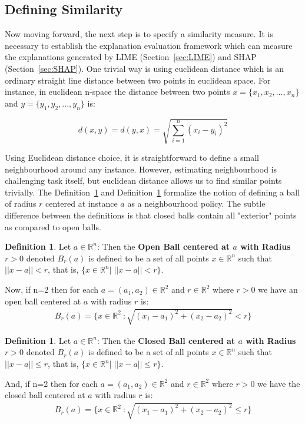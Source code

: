 \documentclass[english]{tktltiki2}
\theoremstyle{definition}
\newtheorem{definition}[thm]{Definition}
\theoremstyle{remark}
\begin{document}
\subsection{Defining Similarity}\label{sec:defining_similarity} %
Now moving forward, the next step is to specify a similarity measure. It is necessary to establish the explanation evaluation framework which can measure the explanations generated by LIME (Section~\ref{sec:LIME}) and SHAP (Section~\ref{sec:SHAP}). One trivial way is using euclidean distance which is an ordinary straight line distance between two points in euclidean space. For instance, in euclidean n-space the distance between two points $x = \{x_1, x_2, ..., x_n\}$ and $y = \{y_1, y_2, ..., y_n\}$ is:

\begin{equation}\label{eq:euclidean_distance}
d(x,y) = d(y,x) = \sqrt{\sum_{i=1}^{n}(x_i - y_i)^2}
\end{equation}

Using Euclidean distance choice, it is straightforward to define a small neighbourhood around any instance. However, estimating neighbourhood is challenging task itself, but euclidean distance allows us to find similar points trivially. The Definition~\ref{def:1} and Definition~\ref{def:2} formalize the notion of defining a ball of radius $r$ centered at instance $a$ as a neighbourhood policy. The subtle difference between the definitions is that closed balls contain all "exterior" points as compared to open balls.

\begin{definition}\label{def:1}{Let $a \in {\mathbb{R}}^n$: Then the \textbf{Open Ball centered at $a$ with Radius $r > 0$} denoted $B_{r}(a)$ is defined to be a set of all points $x \in {\mathbb{R}}^n$ such that $||x-a|| < r$, that is, $\{x \in {\mathbb{R}}^n |\;||x - a|| < r\}.$}
\end{definition}
Now, if n=2 then for each $a = (a_1,a_2) \in {\mathbb{R}}^2$ and $r \in {\mathbb{R}}^2$ where $r > 0$ we have an open ball centered at $a$ with radius $r$ is:
\begin{align*}
B_{r}(a) = \{x \in {\mathbb{R}}^2\ : \sqrt{(x_1 - a_1)^2 + (x_2 - a_2)^2} < r\}
\end{align*}

\begin{definition}\label{def:2}{Let $a \in {\mathbb{R}}^n$: Then the \textbf{Closed Ball centered at $a$ with Radius $r > 0$} denoted $B_{r}(a)$ is defined to be a set of all points $x \in {\mathbb{R}}^n$ such that $||x-a|| \leq r$, that is, $\{x \in {\mathbb{R}}^n |\;||x - a|| \leq r\}.$}
\end{definition}
And, if n=2 then for each $a = (a_1,a_2) \in {\mathbb{R}}^2$ and $r \in {\mathbb{R}}^2$ where $r > 0$ we have the closed ball centered at $a$ with radius $r$ is:
\begin{align*}
B_{r}(a) = \{x \in {\mathbb{R}}^2\ : \sqrt{(x_1 - a_1)^2 + (x_2 - a_2)^2} \leq r\}
\end{align*}
\end{document}
